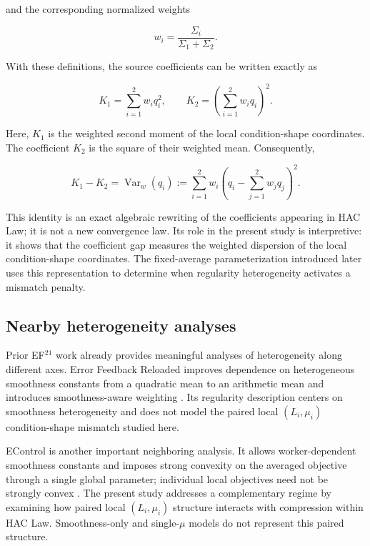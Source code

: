 and the corresponding normalized weights

\[
w_i=
\frac{\Sigma_i}{\Sigma_1+\Sigma_2}.
\]

With these definitions, the source coefficients can be written exactly as

\[
K_1=\sum_{i=1}^{2} w_iq_i^2,
\qquad
K_2=\left(\sum_{i=1}^{2} w_iq_i\right)^2.
\]

Here, $K_1$ is the weighted second moment of the local condition-shape coordinates. The coefficient $K_2$ is the square of their weighted mean. Consequently,

\[
K_1-K_2
=
\operatorname{Var}_w(q_i)
:=
\sum_{i=1}^{2}
w_i
\left(
q_i-\sum_{j=1}^{2}w_jq_j
\right)^2.
\]

This identity is an exact algebraic rewriting of the coefficients appearing in HAC Law; it is not a new convergence law. Its role in the present study is interpretive: it shows that the coefficient gap measures the weighted dispersion of the local condition-shape coordinates. The fixed-average parameterization introduced later uses this representation to determine when regularity heterogeneity activates a mismatch penalty.

\subsection{Nearby heterogeneity analyses}

Prior EF$^{21}$ work already provides meaningful analyses of heterogeneity along different axes. Error Feedback Reloaded improves dependence on heterogeneous smoothness constants from a quadratic mean to an arithmetic mean and introduces smoothness-aware weighting \citep{richtarik2024reloaded}. Its regularity description centers on smoothness heterogeneity and does not model the paired local $(L_i,\mu_i)$ condition-shape mismatch studied here.

EControl is another important neighboring analysis. It allows worker-dependent smoothness constants and imposes strong convexity on the averaged objective through a single global parameter; individual local objectives need not be strongly convex \citep{gao2024econtrol}. The present study addresses a complementary regime by examining how paired local $(L_i,\mu_i)$ structure interacts with compression within HAC Law. Smoothness-only and single-$\mu$ models do not represent this paired structure.
